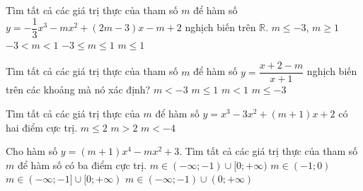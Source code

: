 \begin{ex}%
 Tìm tất cả các giá trị thực của tham số $m$ để hàm số $y=-\dfrac{1}{3}x^3-mx^2+(2m-3)x-m+2$ nghịch biến trên $\mathbb{R}$.
 \choice
 {$m\le -3$, $m\ge 1$}
 {$-3<m<1$}
 {\True $-3\le m\le 1$}
 {$m\le 1$}
\end{ex}
\begin{ex}
 Tìm tất cả các giá trị thực của tham số $m$ để hàm số $y=\dfrac{x+2-m}{x+1}$ nghịch biến trên các khoảng mà nó xác định?
 \choice
 {$m<-3$}
 {$m\le 1$}
 {\True $m<1$}
 {$m\le -3$}
\end{ex}
\begin{ex}%
 Tìm tất cả các giá trị thực của $m$ để hàm số $y=x^3-3x^2+(m+1)x+2$ có hai điểm cực trị.
 {$m\le 2$}
 {$m>2$}
 {$m<-4$}
\end{ex}
\begin{ex}%
 Cho hàm số $y=(m+1)x^4-mx^2+3$. Tìm tất cả các giá trị thực của tham số $m$ để hàm số có ba điểm cực trị.
 \choice
 {$m\in (-\infty;-1)\cup [0;+\infty)$}
 {$m\in (-1;0)$}
 {$m\in (-\infty;-1]\cup [0;+\infty)$}
 {\True $m\in (-\infty;-1)\cup (0;+\infty)$}
\end{ex}
